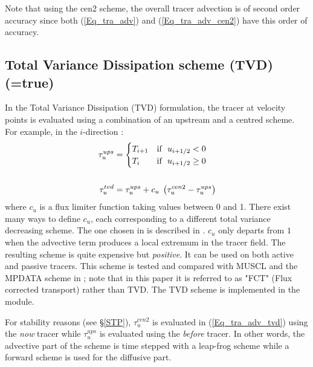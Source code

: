 \documentclass[NEMO_book]{subfiles}
\begin{document}
Note that using the cen2 scheme, the overall tracer advection is of second 
order accuracy since both (\ref{Eq_tra_adv}) and (\ref{Eq_tra_adv_cen2}) 
have this order of accuracy. 


\subsection   [Total Variance Dissipation scheme (TVD) (\np{ln\_traadv\_tvd})]
			{Total Variance Dissipation scheme (TVD) (=true)}
\label{TRA_adv_tvd}

In the Total Variance Dissipation (TVD) formulation, the tracer at velocity 
points is evaluated using a combination of an upstream and a centred scheme. 
For example, in the $i$-direction :
\begin{equation} \label{Eq_tra_adv_tvd}
\begin{split}
\tau _u^{ups}&= \begin{cases}
 					T_{i+1} 	& \text{if $\ u_{i+1/2} <     0$} \hfill \\
 					T_i   		& \text{if $\ u_{i+1/2} \geq 0$} \hfill \\
				  \end{cases}     \\
\\
\tau _u^{tvd}&=\tau _u^{ups} +c_u \;\left( {\tau _u^{cen2} -\tau _u^{ups} } \right)
\end{split}
\end{equation}
where $c_u$ is a flux limiter function taking values between 0 and 1. 
There exist many ways to define $c_u$, each corresponding to a different 
total variance decreasing scheme. The one chosen in \NEMO is described in 
\citet{Zalesak_JCP79}. $c_u$ only departs from $1$ when the advective term 
produces a local extremum in the tracer field. The resulting scheme is quite 
expensive but \emph{positive}. It can be used on both active and passive tracers. 
This scheme is tested and compared with MUSCL and the MPDATA scheme in 
\citet{Levy_al_GRL01}; note that in this paper it is referred to as "FCT" (Flux corrected 
transport) rather than TVD. The TVD scheme is implemented in the  module.

For stability reasons (see \S\ref{STP}),
$\tau _u^{cen2}$ is evaluated  in (\ref{Eq_tra_adv_tvd}) using the \textit{now} tracer while $\tau _u^{ups}$ 
is evaluated using the \textit{before} tracer. In other words, the advective part of 
the scheme is time stepped with a leap-frog scheme while a forward scheme is 
used for the diffusive part. 
\end{document}
